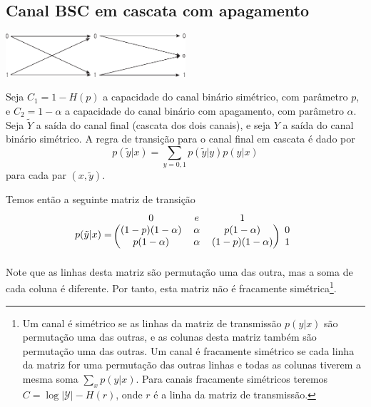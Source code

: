 \subsection{Canal BSC em cascata com apagamento}
\begin{questions}

\begin{solution}

\includegraphics[width=0.5\textwidth]{../images/canalbinapag.pdf}

Seja $C_1 = 1 - H(p)$ a capacidade do canal binário simétrico, com parâmetro $p$, e
$C_2 = 1 - \alpha$ a capacidade do canal binário com apagamento, com parâmetro $\alpha$.
Seja $\tilde{Y}$ a saída do canal final (cascata dos dois canais), e seja $Y$ a saída 
do canal binário simétrico. A regra de transição para o canal final em cascata é dado por
\begin{equation}
p(\tilde{y}|x) = \sum_{y=0,1} p(\tilde{y}|y) p(y|x)
\end{equation}
para cada par $(x,\tilde{y})$.

Temos então a seguinte matriz de transição
\begin{equation}
  p(\tilde{y} \vert x) = 
\begin{blockarray}{cccc}
 0 & e & 1  \\
\begin{block}{(ccc)c}
  (1-p)(1-\alpha) & \alpha & p(1-\alpha)     & 0 \\
  p(1-\alpha)     & \alpha & (1-p)(1-\alpha) & 1 \\
\end{block}
\end{blockarray}
\label{eqmatq8}
\end{equation}
Note que as linhas desta matriz são permutação uma das outra, mas
a soma de cada coluna é diferente. Por tanto, esta matriz não é fracamente simétrica\footnote{
  Um canal é simétrico se as linhas da matriz de transmissão $p(y|x)$ são permutação uma das outras,
  e as colunas desta matriz também são permutação uma das outras. Um canal é fracamente simétrico
  se cada linha da matriz for uma permutação das outras linhas e todas as colunas tiverem a mesma
  soma $\sum_x p(y|x)$. Para canais fracamente simétricos teremos 
  $C = \log \vert \mathcal{Y} \vert - H(r)$, onde $r$ é a linha da matriz de transmissão.
}. 


\end{solution}
\end{questions}
